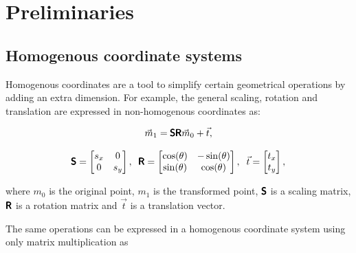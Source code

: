 \chapter{Preliminaries}

\label{chapter:preliminaries}
\section{Homogenous coordinate systems}

Homogenous coordinates are a tool to simplify certain geometrical operations by adding an extra dimension.
For example, the general scaling, rotation and translation are expressed in non-homogenous coordinates as:

\begin{equation}
    \vec{m}_1 = 
    \pmb{\mathsf{S}} \pmb{\mathsf{R}}
    \vec{m}_0
    + \vec{t},
\end{equation}

\begin{equation}
    \pmb{\mathsf{S}} = \begin{bmatrix} s_x & 0 \\ 0 & s_y \end{bmatrix}, \;\; 
    \pmb{\mathsf{R}} = \begin{bmatrix} \cos(\theta) & -\sin(\theta) \\ \sin(\theta) & \cos(\theta) \end{bmatrix}, \;\;
    \vec{t} = \begin{bmatrix} t_x \\ t_y \end{bmatrix},
\end{equation}

where $m_0$ is the original point,
$m_1$ is the transformed point, 
$\pmb{\mathsf{S}}$ is a scaling matrix,
$\pmb{\mathsf{R}}$ is a rotation matrix and 
$\vec{t}$ is a translation vector.

The same operations can be expressed in a homogenous coordinate system using only matrix multiplication as

